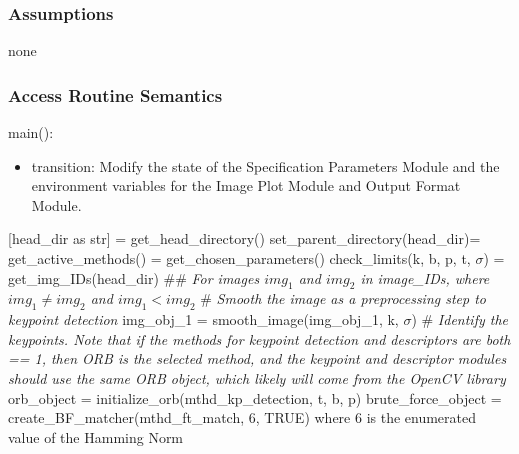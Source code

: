 \documentclass[12pt, titlepage]{article}
\begin{document}
\subsubsection{Assumptions}
none

\subsubsection{Access Routine Semantics}
\noindent main():
\begin{itemize}
\item transition: Modify the state of the Specification Parameters Module and the 
environment variables for the Image Plot Module and Output Format Module.
\end{itemize}
[head\_dir as str] = get\_head\_directory() \newline
set\_parent\_directory(head\_dir)\newline {} 
= get\_active\_methods() \newline {}
= get\_chosen\_parameters() \newline \newline
check\_limits(k, b, p, t, $\sigma$) \newline {} = get\_img\_IDs(head\_dir) \newline \newline
\#\# \textit{For images $img_{1}$ and $img_{2}$ in image\_IDs, where $img_{1} \neq img_{2}$ and $img_{1} < img_{2}$}\newline
\# \textit{Smooth the image as a preprocessing step to keypoint detection} \newline
img\_obj\_1 = smooth\_image(img\_obj\_1, k, $\sigma$) \newline \newline
\# \textit{Identify the keypoints. Note that if the methods for keypoint detection and 
descriptors are both == 1, then ORB is the selected method, and the keypoint and descriptor 
modules should use the same ORB object, which likely will come from the OpenCV library}\newline \newline
orb\_object = initialize\_orb(mthd\_kp\_detection, t, b, p) \newline
brute\_force\_object = create\_BF\_matcher(mthd\_ft\_match, 6, TRUE) where 6 is the enumerated value of the Hamming Norm \newline
\end{document}

